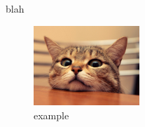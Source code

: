 \documentclass[PICOReport.tex]{subfiles}
\begin{document}
blah

\begin{figure}[!htb]
\centering
\includegraphics[width=4cm]{images/example}
\caption{example}
\label{fig:im_3}
\end{figure}
\end{document}
